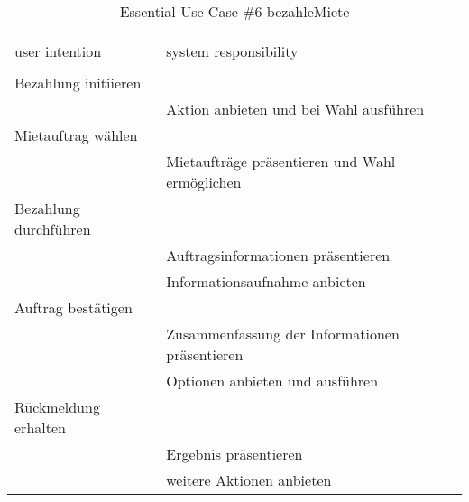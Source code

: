 \begin{table}[H]
\caption{Essential Use Case \#6 bezahleMiete }
\centering
\begin{tabular}{l l}
\\ [-0.5ex]

\hline\hline
\\ [-0.5ex]
user intention & system responsibility
\\ [1.5ex]
\hline
\\ [-0.5ex]
Bezahlung initiieren    &                                 \\[1ex]
                     & Aktion anbieten und bei Wahl ausführen   \\[1ex]
Mietauftrag wählen         &                                 \\[1ex] 
                     & Mietaufträge präsentieren und Wahl ermöglichen \\[1ex]
Bezahlung durchführen      &                                 \\[1ex]
                     & Auftragsinformationen präsentieren       \\[1ex]
                     & Informationsaufnahme anbieten            \\[1ex]
Auftrag bestätigen         &                                 \\[1ex]
                     & Zusammenfassung der Informationen präsentieren \\[1ex]
                     & Optionen anbieten  und ausführen         \\[1ex]
Rückmeldung erhalten    &                                       \\[1ex]
                     & Ergebnis präsentieren                  \\[1ex]
                     & weitere Aktionen anbieten                 \\[1ex]


\hline
\end{tabular}
\label{tab:bezahlung}
\end{table}

